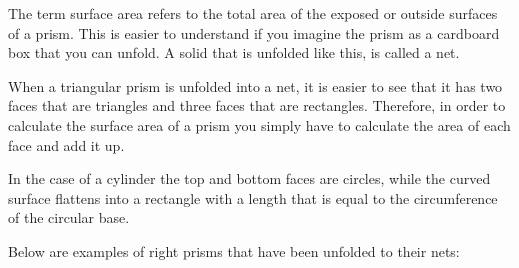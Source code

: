  The term surface area refers to the total area of the exposed or outside surfaces of a prism.
This is easier to understand if you imagine the prism as a cardboard box that you can unfold.
A solid that is unfolded like this, is called a net.
\par 

 When a triangular prism is unfolded into a net, it is easier to see that it has two faces that are
triangles and three faces that are rectangles. Therefore, in order to calculate the surface area
of a prism you simply have to calculate the area of each face and add it up.
  \par
In the case of a cylinder the top and bottom faces are circles, while the curved surface flattens
into a rectangle with a length that is equal to the circumference of the circular base.

\par
Below are examples of right prisms that have been unfolded to their nets:

